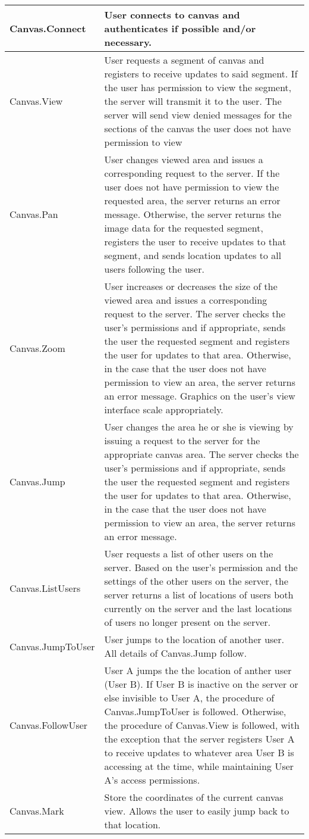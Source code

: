 \documentclass[11pt,oneside,a4paper]{article}
\begin{document}
\begin{center}
\begin{tabular}{ | p{6cm} | p{6cm} | }
\hline
\tiny{Canvas.Connect}		& \tiny{User connects to canvas and authenticates if possible and/or necessary.} \\
\hline
\tiny{Canvas.View}		& \tiny{User requests a segment of canvas and registers to receive updates to said segment. If the user has permission to view the segment, the server will transmit it to the user. The server will send view denied messages for the sections of the canvas the user does not have permission to view} \\
\hline
\tiny{Canvas.Pan}		& \tiny{User changes viewed area and issues a corresponding request to the server. If the user does not have permission to view the requested area, the server returns an error message. Otherwise, the server returns the image data for the requested segment, registers the user to receive updates to that segment, and sends location updates to all users following the user.} \\
\hline
\tiny{Canvas.Zoom}		& \tiny{User increases or decreases the size of the viewed area and issues a corresponding request to the server. The server checks the user's permissions and if appropriate, sends the user the requested segment and registers the user for updates to that area. Otherwise, in the case that the user does not have permission to view an area, the server returns an error message. Graphics on the user's view interface scale appropriately.} \\
\hline
\tiny{Canvas.Jump}		& \tiny{User changes the area he or she is viewing by  issuing a request to the server for the appropriate canvas area. The server checks the user's permissions and if appropriate, sends the user the requested segment and registers the user for updates to that area. Otherwise, in the case that the user does not have permission to view an area, the server returns an error message.} \\
\hline
\tiny{Canvas.ListUsers}		& \tiny{User requests a list of other users on the server. Based on the user's permission and the settings of the other users on the server, the server returns a list of locations of users both currently on the server and the last locations of users no longer present on the server.} \\
\hline
\tiny{Canvas.JumpToUser}	& \tiny{User jumps to the location of another user. All details of Canvas.Jump follow.} \\
\hline
\tiny{Canvas.FollowUser}	& \tiny{User A jumps the the location of anther user (User B). If User B is inactive on the server or else invisible to User A, the procedure of Canvas.JumpToUser is followed. Otherwise, the procedure of Canvas.View is followed, with the exception that the server registers User A to receive updates to whatever area User B is accessing at the time, while maintaining User A's access permissions.} \\
\hline
\tiny{Canvas.Mark}		& \tiny{Store the coordinates of the current canvas view. Allows the user to easily jump back to that location.} \\
\hline
\end{tabular}
\end{center}
\end{document}
